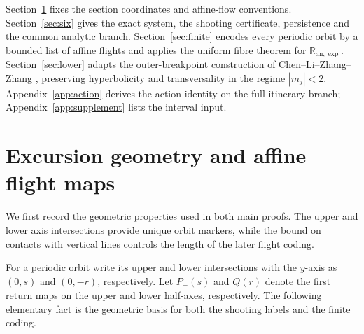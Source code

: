 \documentclass[11pt]{article}
\theoremstyle{remark}
\newcommand{\Ranexp}{\mathbb R_{\mathrm{an},\exp}}
\begin{document}
Section~\ref{sec:geometry} fixes the section coordinates and affine-flow
conventions.  Section~\ref{sec:six} gives the exact system, the shooting
certificate, persistence and the common analytic branch.
Section~\ref{sec:finite} encodes every periodic orbit by a bounded list of
affine flights and applies the uniform fibre theorem for \(\Ranexp\).
Section~\ref{sec:lower} adapts the outer-breakpoint construction of
Chen--Li--Zhang--Zhang \cite{clzz}, preserving hyperbolicity and
transversality in the regime \(|m_j|<2\).
Appendix~\ref{app:action} derives the action identity on the full-itinerary
branch; Appendix~\ref{app:supplement} lists the interval input.

\section{Excursion geometry and affine flight maps}\label{sec:geometry}

We first record the geometric properties used in both main proofs.  The
upper and lower axis intersections provide unique orbit markers, while the
bound on contacts with vertical lines controls the length of the later
flight coding.

For a periodic orbit write its upper and lower intersections with the
\(y\)-axis as \((0,s)\) and \((0,-r)\), respectively.  Let \(P_+(s)\)
and \(Q(r)\) denote the first return maps on the upper and lower
half-axes, respectively.  The following
elementary fact is the geometric basis for both the shooting labels and
the finite coding.
\end{document}
